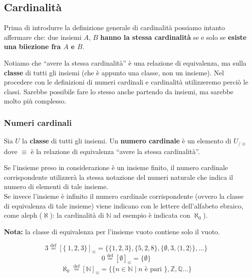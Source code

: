 \documentclass[
  a4paper,
]{article}
\begin{document}
\hypertarget{cardinalituxe0}{%
\subsection{Cardinalità}\label{cardinalituxe0}}

Prima di introdurre la definizione generale di cardinalità possiamo
intanto affermare che: due insiemi \(A\), \(B\) \textbf{hanno la stessa
cardinalità} se e solo se \textbf{esiste una biiezione fra \(A\) e
\(B\)}.

Notiamo che ``avere la stessa cardinalità'' è una relazione di
equivalenza, ma sulla \textbf{classe} di tutti gli insiemi (che è
appunto una classe, non un insieme). Nel procedere con le definizioni di
numeri cardinali e cardinalità utilizzeremo perciò le classi. Sarebbe
possibile fare lo stesso anche partendo da insiemi, ma sarebbe molto più
complesso.

\hypertarget{numeri-cardinali}{%
\subsubsection{Numeri cardinali}\label{numeri-cardinali}}

Sia \(U\) la \textbf{classe} di tutti gli insiemi. Un \textbf{numero
cardinale} è un elemento di \(U_{/\equiv}\) dove \(\equiv\) è la
relazione di equivalenza ``avere la stessa cardinalità''.

Se l'insieme preso in considerazione è un insieme finito, il numero
cardinale corrispondente utilizzerà la stessa notazione del numeri
naturale che indica il numero di elementi di tale insieme.\\
Se invece l'insieme è infinito il numero cardinale corrispondente
(ovvero la classe di equivalenza di tale insieme) viene indicano con le
lettere dell'alfabeto ebraico, come aleph (\(\aleph\)): la cardinalità
di \(\mathbb{N}\) ad esempio è indicata con \(\aleph_0\)).

\textbf{Nota:} la classe di equivalenza per l'insieme vuoto contiene
solo il vuoto.

\begin{examplebox}[Esempi]

\[
3 \overset{\mathrm{def}}{=} [\{\ 1, 2, 3\}]_\equiv = \{\{1, 2, 3\}, \{5, 2, 8\}, \{\emptyset, 3, \langle 1, 2 \rangle \}, \dots\}
\] \[
0 \overset{\mathrm{def}}{=} [\emptyset]_\equiv = \{\emptyset\}
\] \[
\aleph_0 \overset{\mathrm{def}}{=} [\mathbb{N}]_\equiv = \{\{n \in \mathbb{N} \mid n \text{ è pari }\}, \mathbb{Z}, \mathbb{Q} \dots \}
\]

\end{examplebox}
\end{document}
